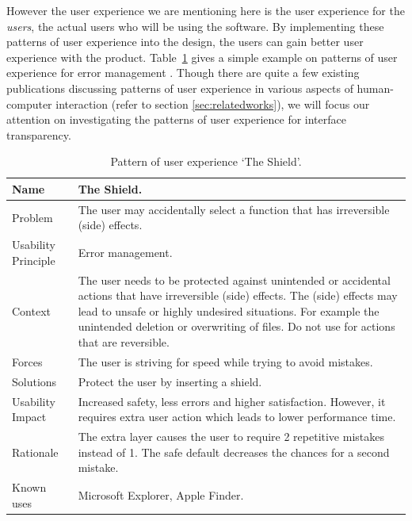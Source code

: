 \documentclass{acm_proc_article-sp}
\begin{document}
However the user experience we are mentioning here is the user
experience for the \textit{users}, the actual users who will be using
the software. By implementing these patterns of user experience into
the design, the users can gain better user experience with the
product. Table~\ref{tab:shield} gives a simple example on patterns of
user experience for error management \citep{patterns:welie}. Though
there are quite a few existing publications discussing patterns of
user experience in various aspects of human-computer interaction
(refer to section \ref{sec:relatedworks}), we will focus our attention
on investigating the patterns of user experience for interface
transparency.

\begin{table}[!t]
  \caption{Pattern of user experience `The Shield'.}
  \label{tab:shield}
  \begin{center}
    \begin{tabular}{| p{} || p{} |}
      \hline
      Name & The Shield. \\ \hline

      Problem & The user may accidentally select a function that has
      irreversible (side) effects. \\ \hline

      Usability Principle & Error management. \\ \hline

      Context & The user needs to be protected against unintended or
      accidental actions that have irreversible (side) effects. The
      (side) effects may lead to unsafe or highly undesired
      situations. For example the unintended deletion or overwriting
      of files. Do not use for actions that are reversible. \\ \hline

      Forces & The user is striving for speed while trying to avoid
      mistakes. \\ \hline

      Solutions & Protect the user by inserting a shield. \\ \hline

      Usability Impact & Increased safety, less errors and higher
      satisfaction. However, it requires extra user action which leads
      to lower performance time. \\ \hline

      Rationale & The extra layer causes the user to require 2
      repetitive mistakes instead of 1. The safe default decreases the
      chances for a second mistake. \\ \hline

      Known uses & Microsoft Explorer, Apple Finder. \\ \hline
    \end{tabular}
  \end{center}
\end{table}
\end{document}
